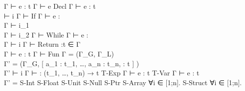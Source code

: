 {{             { Γ ⊢ e : t }
             { Γ ⊢ e }
         }
    {Decl}{ 
              { Γ ⊢ e : t
             \\  ⊢ i
              }
              { Γ ⊢  }
          }
    {If}{ 
            { Γ ⊢ e : \tInt \\
              Γ ⊢ i_1 \\
              Γ ⊢ i_2
            }
            { Γ ⊢  }
        }
    {While}{ 
               { Γ ⊢ e : \tInt \\
                 Γ ⊢ i
               }
               { Γ ⊢  }
           }
    {Return}{ 
                { \vRet:t ∈ Γ
               \\ Γ ⊢ e : t
                }
                { Γ ⊢  }
            }
    {Fun}{ 
             { Γ  = (Γ_G, Γ_L)
            \\ Γ' = (Γ_G,
                     [ a_1 : t_1,
                       …,
                       a_n : t_n,
                       \vRet : t
                     ]
                    )
            \\ Γ' ⊢ i
             }
             { Γ ⊢ 
                    : (t_1, …, t_n) → t
             }
         }
    {T-Exp}{ 
                { Γ ⊢ e : t }
                {  }
            }
    {T-Var}{ 
                { Γ ⊢ e : t
               \\ Γ' = 
                }
                {  }
            }
    {S-Int}{ 
               { }
               {}
           }
    {S-Float}{ 
                 { }
                 {}
    }
    {S-Unit}{ 
                { }
                {}
    }
    {S-Null}{ 
                { }
                {}
    }
    {S-Ptr}{ 
               {}
               {}
    }
    {S-Array}{ 
                 { ∀i ∈ [1;n]. }
                 {  }
    }
    {S-Struct}{ 
                  { ∀i ∈ [1;n].  }
                  { 
                                        {  }
                  }
}}
